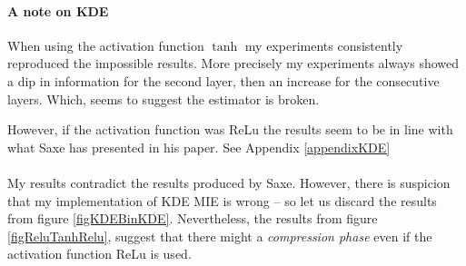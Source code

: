 \documentclass[dissertation.tex]{subfiles}
\begin{document}
\paragraph{A note on KDE}
When using the activation function $\tanh$ my
experiments consistently reproduced the impossible results. 
More precisely my experiments always showed a dip in information for the second
layer, then an increase for the consecutive layers. Which, seems to suggest the
estimator is broken.

However, if the activation function was ReLu the results seem to be in line with
what Saxe has presented in his paper. See Appendix \ref{appendixKDE}

\paragraph{} My results contradict the results produced by Saxe. 
However, there is suspicion that my implementation of KDE MIE is wrong -- so let
us discard the results from figure \autoref{figKDEBinKDE}.
Nevertheless, the results from figure \autoref{figReluTanhRelu}, suggest that
there might a \emph{compression phase} even if the activation function ReLu is
used.
\end{document}

